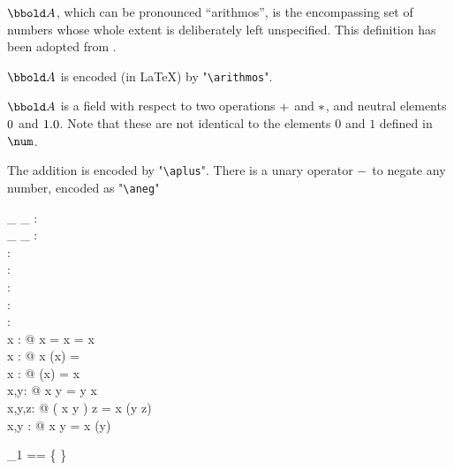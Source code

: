 \documentclass[12pt]{scrartcl}
\begin{document}
$\arithmos$, which can be pronounced “arithmos”, is the encompassing
set of numbers whose whole extent is deliberately left
unspecified. This definition has been adopted from
\cite{Valentine2012}.

\begin{zed}
  [\arithmos] 
\end{zed}

$\arithmos$ is encoded (in \LaTeX) by "\texttt{\textbackslash arithmos}".

$\arithmos$ is a field with respect to two operations $+$ and
$*$, and neutral elements $0$ and $1.0$. Note that these
are not identical to the elements $0$ and $1$ defined in $\num$.

The addition is encoded by "\texttt{\textbackslash{}aplus}". There is
a unary operator $-$ to negate any number, encoded as
"\texttt{\textbackslash{}aneg}"
\begin{axdef}
  \_ \aplus \_ : \arithmos \cross \arithmos \fun \arithmos\\
  \_ \aminus \_ : \arithmos \cross \arithmos \fun \arithmos\\
  \aneg : \arithmos \fun \arithmos\\
  \azero : \arithmos\\
  \aone : \arithmos\\
  \atwo : \arithmos\\
  \aten : \arithmos\\
  \where
  \forall x : \arithmos @ x \aplus \azero = \azero \aplus x = x \\
  \forall x : \arithmos @ x \aplus (\aneg x) = \azero \\
  \forall x : \arithmos @ \aneg (\aneg x) = x \\
  \forall x,y: \arithmos @ x \aplus y = y \aplus x \\
  \forall x,y,z: \arithmos @ ( x \aplus y ) \aplus z = x \aplus (y
  \aplus z) \\
  \forall x,y : \arithmos @ x \aminus y = x \aplus (\aneg y)\\
\end{axdef}

\begin{zed}
  \arithmos_1 == \arithmos \setminus \{ \azero \}
\end{zed}
\end{document}
